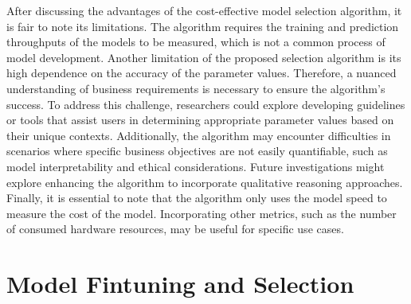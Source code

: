 After discussing the advantages of the cost-effective model selection algorithm, it is fair to note its limitations. The algorithm requires the training and prediction throughputs of the models to be measured, which is not a common process of model development. Another limitation of the proposed selection algorithm is its high dependence on the accuracy of the parameter values. Therefore, a nuanced understanding of business requirements is necessary to ensure the algorithm's success. To address this challenge, researchers could explore developing guidelines or tools that assist users in determining appropriate parameter values based on their unique contexts. Additionally, the algorithm may encounter difficulties in scenarios where specific business objectives are not easily quantifiable, such as model interpretability and ethical considerations. Future investigations might explore enhancing the algorithm to incorporate qualitative reasoning approaches. Finally, it is essential to note that the algorithm only uses the model speed to measure the cost of the model. Incorporating other metrics, such as the number of consumed hardware resources, may be useful for specific use cases.

\section{Model Fintuning and Selection}

